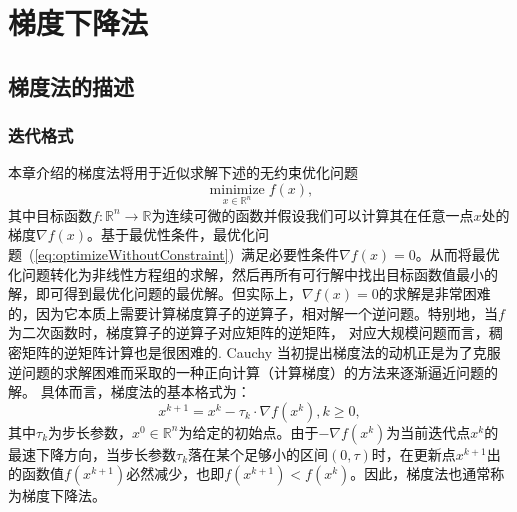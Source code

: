 \chapter{梯度下降法}
\section{梯度法的描述}
\subsection{迭代格式}
本章介绍的梯度法将用于近似求解下述的无约束优化问题
\begin{equation}\label{eq:optimizeWithoutConstraint}
    \operatorname*{minimize}_{x\in\mathbb{R}^n}f(x),
\end{equation}
其中目标函数$f:\mathbb{R}^n\to \mathbb{R}$为连续可微的函数并假设我们可以计算其在任意一点$x$处的梯度$\nabla f(x)$。基于最优性条件，最优化问题~(\ref{eq:optimizeWithoutConstraint})~满足必要性条件$\nabla f(x) = 0$。从而将最优化问题转化为非线性方程组的求解，然后再所有可行解中找出目标函数值最小的解，即可得到最优化问题的最优解。但实际上，$\nabla f(x) = 0$的求解是非常困难的，因为它本质上需要计算梯度算子的逆算子，相对解一个逆问题。特别地，当$f$为二次函数时，梯度算子的逆算子对应矩阵的逆矩阵， 对应大规模问题而言，稠密矩阵的逆矩阵计算也是很困难的. Cauchy 当初提出梯度法的动机正是为了克服逆问题的求解困难而采取的一种正向计算（计算梯度）的方法来逐渐逼近问题的解。 具体而言，梯度法的基本格式为：
\begin{equation}\label{eq:gradient}
    x^{k+1}=x^k-\tau_k\cdot\nabla f(x^k),k\geq0,
\end{equation}
其中$\tau_k$为步长参数，$x^0\in\mathbb{R}^n$为给定的初始点。由于$-\nabla f(x^k)$为当前迭代点$x^k$的最速下降方向，当步长参数$\tau_k$落在某个足够小的区间$(0,\tau)$时，在更新点$x^{k+1}$出的函数值$f(x^{k+1})$必然减少，也即$f(x^{k+1})<f(x^k)$。因此，梯度法也通常称为梯度下降法。

